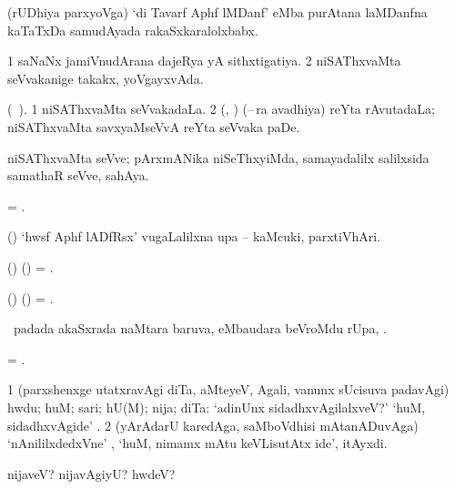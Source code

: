  (rUDhiya parxyoVga) `di  Tavarf Aphf lMDanf' eMba purAtana laMDanfna kaTaTxDa samudAyada rakaSxkaralolxbabx.
\eanum
\numie
\enum
\emng
\eentry

\bentry
{} 
\gl{\gu} 
\bmng
\bnum
\num{1} saNaNx jamiVnudArana dajeRya yA sithxtigatiya. 
\num{2} niSAThxvaMta seVvakanige takakx, yoVgayxvAda.
\enum
\emng 
\eentry

\bentry
{} 
\gl{\nA} 
\bmng
(\bava\ ).
\bnum
\num{1} niSAThxvaMta seVvakadaLa. 
\num{2} (\birx, \ca) (--\,ra avadhiya) reYta rAvutadaLa; niSAThxvaMta  savxyaMseVvA reYta seVvaka paDe.
\enum
\emng
\eentry

\bentry
{}
\gl{\nA} 
\bmng
niSAThxvaMta seVve; pArxmANika niSeThxyiMda, samayadalilx salilxsida samathaR seVve, sahAya.
\emng
\eentry

\bentry
{}
\gl{\nA} 
\bmng
= .
\emng
\eentry

\bentry
{}
\gl{\nA} 
\bmng
(\birx) `hwsf Aphf lADfRsx'  \mo vugaLalilxna upa -- kaMcuki, parxtiVhAri.
\emng
\eentry

\bentry
{} 
\gl{\kirxvi} 
\bmng
(\ame) (\AmA) = .
\emng
\eentry

\bentry
{} 
\gl{\nA} 
\bmng
(\ame) (\AmA) = .
\emng
\eentry

\bentry
{} 
\gl{\uparx} 
\bmng
\sA\ padada  akaSxrada naMtara baruva,  eMbaudara beVroMdu rUpa, \udA. 
\emng
\eentry

\bentry
{}
\gl{\nA} 
\bmng
= .
\emng 
\eentry

\bentry
{} 
\gl{\kirxvi} 
\bmng
\bnum
\num{1}  (parxshenxge utatxravAgi diTa, aMteyeV, Agali, \mo vanunx sUcisuva padavAgi) hwdu; huM; sari; hU(M); nija; diTa:  `adinUnx sidadhxvAgilalxveV?' `huM, sidadhxvAgide' . 
\num{2} (yArAdarU karedAga, saMboVdhisi mAtanADuvAga) `nAnililxdedxVne' , `huM, nimamx mAtu keVLisutAtx ide', itAyxdi.   
\enum
\emng

\noindent                         
\gl{\pagu}
\bmng
\bnum
{}  
\banum
{} nijaveV? nijavAgiyU? hwdeV? 

